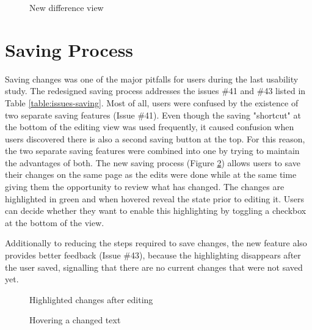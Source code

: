 \begin{figure}[h!]
 \centering
 \caption{New difference view}
 \label{fig:diff-split}
\end{figure}

\section{Saving Process}
Saving changes was one of the major pitfalls for users during the last usability study. The redesigned saving process addresses the issues \#41 and \#43 listed in Table \ref{table:issues-saving}. Most of all, users were confused by the existence of two separate saving features (Issue \#41). Even though the saving "shortcut" at the bottom of the editing view was used frequently, it caused confusion when users discovered there is also a second saving button at the top. For this reason, the two separate saving features were combined into one by trying to maintain the advantages of both. The new saving process (Figure \ref{fig:highlighted-changes}) allows users to save their changes on the same page as the edits were done while at the same time giving them the opportunity to review what has changed. The changes are highlighted in green and when hovered reveal the state prior to editing it. Users can decide whether they want to enable this highlighting by toggling a checkbox at the bottom of the view.

Additionally to reducing the steps required to save changes, the new feature also provides better feedback (Issue \#43), because the highlighting disappears after the user saved, signalling that there are no current changes that were not saved yet.



\begin{figure}[h!]
 \centering
 \caption{Highlighted changes after editing}
 \label{fig:highlighted-changes}
\end{figure}

\begin{figure}[h!]
 \centering
 \caption{Hovering a changed text}
 \label{fig:hover-changed-text}
\end{figure}

